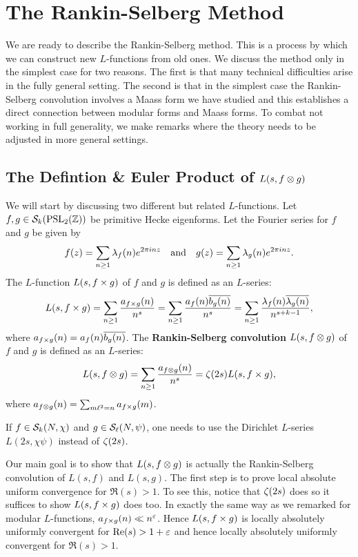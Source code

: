   \section{The Rankin-Selberg Method}\label{sec:The_Rankin-Selberg_Method}
    We are ready to describe the Rankin-Selberg method. This is a process by which we can construct new $L$-functions from old ones. We discuss the method only in the simplest case for two reasons. The first is that many technical difficulties arise in the fully general setting. The second is that in the simplest case the Rankin-Selberg convolution involves a Maass form we have studied and this establishes a direct connection between modular forms and Maass forms. To combat not working in full generality, we make remarks where the theory needs to be adjusted in more general settings.
    \subsection*{The Defintion \& Euler Product of \texorpdfstring{$L(s,f \otimes g)$}{L(s,f \ox g)}}
      We will start by discussing two different but related $L$-functions. Let $f,g \in \mathcal{S}_{k}(\mathrm{PSL}_{2}(\mathbb{Z}))$ be primitive Hecke eigenforms. Let the Fourier series for $f$ and $g$ be given by
      \[
        f(z) = \sum_{n \ge 1}\lambda_{f}(n)e^{2\pi inz} \quad \text{and} \quad g(z) = \sum_{n \ge 1}\lambda_{g}(n)e^{2\pi inz}.
      \]
      The $L$-function $L(s,f \times g)$ of $f$ and $g$ is defined as an $L$-series:
      \[
        L(s,f \times g) = \sum_{n \ge 1}\frac{a_{f \times g}(n)}{n^{s}} = \sum_{n \ge 1}\frac{a_{f}(n)\overline{b_{g}(n)}}{n^{s}} = \sum_{n \ge 1}\frac{\lambda_{f}(n)\overline{\lambda_{g}(n)}}{n^{s+k-1}},
      \]
      where $a_{f \times g}(n) = a_{f}(n)\overline{b_{g}(n)}$. The \textbf{Rankin-Selberg convolution} $L(s,f \otimes g)$ of $f$ and $g$ is defined as an $L$-series:
      \[
        L(s,f \otimes g) = \sum_{n \ge 1}\frac{a_{f \otimes g}(n)}{n^{s}} = \zeta(2s)L(s,f \times g),
      \]
      where $a_{f \otimes g}(n) = \sum_{m\ell^{2} = n}a_{f \times g}(m)$.

      \begin{remark}
        If $f \in \mathcal{S}_{k}(N,\chi)$ and $g \in \mathcal{S}_{\ell}(N,\psi)$, one needs to use the Dirichlet $L$-series $L(2s,\chi\psi)$ instead of $\zeta(2s)$.
      \end{remark}

      Our main goal is to show that $L(s,f \otimes g)$ is actually the Rankin-Selberg convolution of $L(s,f)$ and $L(s,g)$. The first step is to prove local absolute uniform convergence for $\Re(s) > 1$. To see this, notice that $\zeta(2s)$ does so it suffices to show $L(s,f \times g)$ does too. In exactly the same way as we remarked for modular $L$-functions, $a_{f \times g}(n) \ll n^{\varepsilon}$. Hence $L(s,f \times g)$ is locally absolutely uniformly convergent for $\mathrm{Re}(s) > 1+\varepsilon$ and hence locally absolutely uniformly convergent for $\Re(s) > 1$.
      
